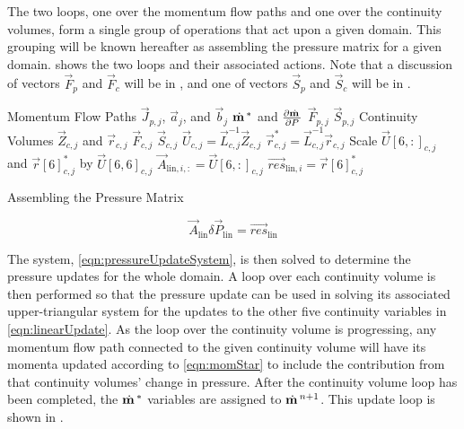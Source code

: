 The two loops, one over the momentum flow paths and one over the continuity volumes, form a single group of operations that act upon a given domain.
This grouping will be known hereafter as assembling the pressure matrix for a given domain.
 shows the two loops and their associated actions.
Note that a discussion of vectors $\vec{F}_{p}$ and $\vec{F}_{c}$ will be in , and one of vectors $\vec{S}_{p}$ and $\vec{S}_{c}$ will be in .

\begin{algo}[ht!]
\setlength{\baselineskip}{0.625\baselineskip}
\begin{algorithmic}[1]
\Loop \; Momentum Flow Paths
	\Calculate $\vec{J}_{p, j}$, $\vec{a}_{j}$, and $\vec{b}_{j}$
	\Calculate $\momVec{}^{*}$ and $\frac{\partial \momVec{}}{\partial P}$
	\Calculate $\vec{F}_{p, j}$	
	\Calculate $\vec{S}_{p, j}$	
\EndLoop
\Loop \; Continuity Volumes
   	\Calculate $\vec{Z}_{c,j}$ and $\vec{r}_{c, j}$
 	\Calculate $\vec{F}_{c, j}$	
	\Calculate $\vec{S}_{c, j}$	
   	\Calculate $\vec{U}_{c, j} = \vec{L}_{c, j}^{-1} \vec{Z}_{c, j}$
   	\Calculate $\vec{r}^{*}_{c, j} = \vec{L}_{c, j}^{-1} \vec{r}_{c, j}$
   	\Set Scale $\vec{U}[6, :]_{c, j}$ and $\vec{r}[6]^{*}_{c, j}$ by $\vec{U}[6,6]_{c, j}$
   	\Set $\vec{A}_{\text{lin},i, :} = \vec{U}[6,:]_{c, j}$
   	\Set $\vec{res}_{\text{lin},i} = \vec{r}[6]^{*}_{c, j}$
\EndLoop
\end{algorithmic}
\caption{Assembling the Pressure Matrix}
\label{alg:xschem}
\end{algo}

\begin{equation}
\label{eqn:pressureUpdateSystem}
\vec{A}_{\text{lin}} \delta \vec{P}_{\text{lin}} = \vec{res}_{\text{lin}}
\end{equation}

The system, \eqref{eqn:pressureUpdateSystem}, is then solved to determine the pressure updates for the whole domain.
A loop over each continuity volume is then performed so that the pressure update can be used in solving its associated upper-triangular system for the updates to the other five continuity variables in \eqref{eqn:linearUpdate}.
As the loop over the continuity volume is progressing, any momentum flow path connected to the given continuity volume will have its momenta updated according to \eqref{eqn:momStar} to include the contribution from that continuity volumes' change in pressure. 
After the continuity volume loop has been completed, the $\momVec{}^{*}$ variables are assigned to $\momVec{}^{n+1}$. 
This update loop is shown in .

